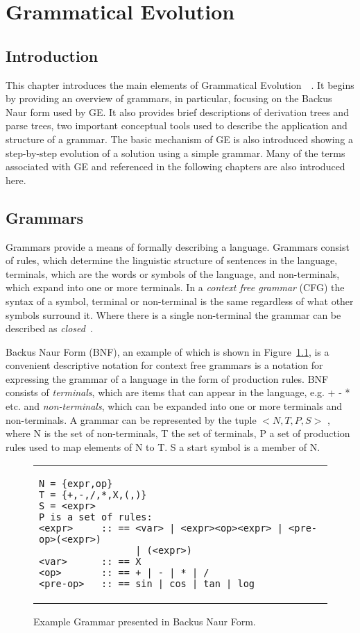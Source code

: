 \chapter{Grammatical Evolution}
\section{Introduction}
This chapter introduces the main elements of Grammatical Evolution~\cite{ieee2001}~\cite{ge_book}. It begins by providing an overview of grammars, in particular, focusing on the Backus Naur form used by GE. It also provides brief descriptions of derivation trees and parse trees, two important conceptual tools used to describe the application and structure of a grammar. The basic mechanism of GE is also introduced showing a step-by-step evolution of a solution using a simple grammar. Many of the terms associated with GE and referenced in the following chapters are also introduced here.



\section{Grammars}
\label{grammars}
Grammars provide a means of formally describing a language. Grammars consist of rules, which determine the linguistic structure of sentences in the language, terminals, which are the words or symbols of the language, and non-terminals, which expand into one or more terminals. In a \emph{context free grammar} (CFG) the syntax of a symbol, terminal or non-terminal is the same regardless of what other symbols surround it. Where there is a single non-terminal the grammar can be described as \emph{closed}~\cite{ripple}. 

Backus Naur Form (BNF), an example of which is shown in Figure~\ref{simple_grammar}, is a convenient descriptive notation for context free grammars is a notation for expressing the grammar of a language in the form of production rules. BNF consists of \emph{terminals}, which are items that can appear in the language, e.g. + - * etc. and \emph{non-terminals}, which can be expanded into one or more terminals and non-terminals.
A grammar can be represented by the tuple $<N,T,P,S>$ , where N is the set of non-terminals, T the set of terminals, P a set of production rules used to map elements of N to T. S a start symbol is a member of N.


\begin{figure}[tbp]
\begin{tabular}{p{}}
\begin{verbatim}
N = {expr,op}
T = {+,-,/,*,X,(,)}
S = <expr>
P is a set of rules:
<expr>     :: == <var> | <expr><op><expr> | <pre-op>(<expr>)
                 | (<expr>) 
<var>      :: == X  	                                           
<op>       :: == + | - | * | /                            
<pre-op>   :: == sin | cos | tan | log        
\end{verbatim}
\end{tabular}
\caption{\label{simple_grammar}Example Grammar presented in Backus Naur Form.}
\end{figure}

